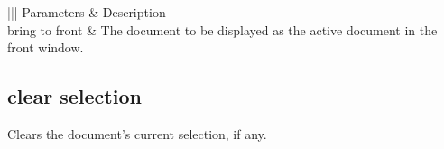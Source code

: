 \documentclass[letterpaper,12pt,english,openany,oneside]{sphinxmanual}
\begin{document}
\label{\detokenize{IAC_API_AppleEvtObjects:syntax-13}}

\begin{sphinxVerbatim}[commandchars=\\\{\}]
  
 \PYG{p}{[}\PYG{p}{]}
\end{sphinxVerbatim}
\label{\detokenize{IAC_API_AppleEvtObjects:parameters-13}}


\begin{savenotes}\sphinxattablestart
\centering
{}\label{\detokenize{IAC_API_AppleEvtObjects:section-28}}\nobreak
\begin{tabular}[t]{|||}
\hline
\sphinxstyletheadfamily 
Parameters
&\sphinxstyletheadfamily 
Description
\\
\hline
bring to front
&
The document to be displayed as the active document in the front window.
\\
\hline
\end{tabular}
\par
\sphinxattableend\end{savenotes}
\label{\detokenize{IAC_API_AppleEvtObjects:applescript-example-9}}

\begin{sphinxVerbatim}[commandchars=\\\{\}]
    
\end{sphinxVerbatim}


\begin{sphinxVerbatim}[commandchars=\\\{\}]
 
\end{sphinxVerbatim}




\subsection{clear selection}
\label{\detokenize{IAC_API_AppleEvtObjects:clear-selection}}
Clears the document’s current selection, if any.

\label{\detokenize{IAC_API_AppleEvtObjects:syntax-14}}
\end{document}
